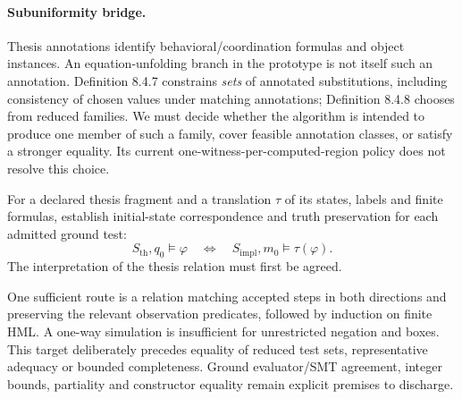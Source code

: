 \paragraph{Subuniformity bridge.}
Thesis annotations identify behavioral/coordination formulas and object instances.
An equation-unfolding branch in the prototype is not itself such an annotation.
Definition 8.4.7 constrains \emph{sets} of annotated substitutions, including
consistency of chosen values under matching annotations; Definition 8.4.8 chooses
from reduced families. We must decide whether the algorithm is intended to produce
one member of such a family, cover feasible annotation classes, or satisfy a
stronger equality. Its current one-witness-per-computed-region policy does not
resolve this choice.

\begin{obligation}
For a declared thesis fragment and a translation $\tau$ of its states, labels and
finite formulas, establish initial-state correspondence and truth preservation
for each admitted ground test:
\[
 S_{\mathrm{th}},q_0\models\varphi
 \quad\Longleftrightarrow\quad
 S_{\mathrm{impl}},m_0\models\tau(\varphi).
\]
The interpretation of the thesis relation must first be agreed.
\end{obligation}
One sufficient route is a relation matching accepted steps in both directions and
preserving the relevant observation predicates, followed by induction on finite
HML. A one-way simulation is insufficient for unrestricted negation and boxes.
This target deliberately precedes equality of reduced test sets, representative
adequacy or bounded completeness. Ground evaluator/SMT agreement, integer bounds,
partiality and constructor equality remain explicit premises to discharge.

